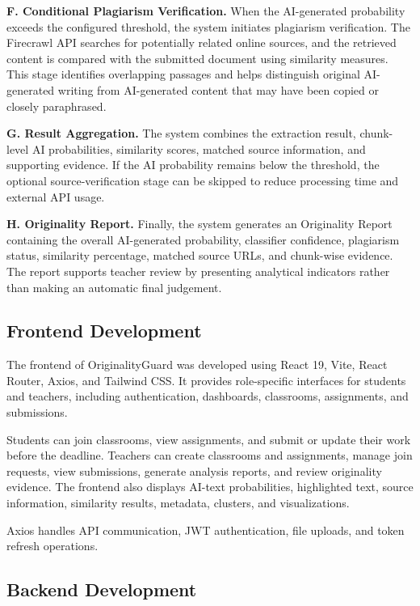 \documentclass[12pt, a4paper]{report}
\numberwithin{equation}{chapter}
\begin{document}
\noindent\textbf{F. Conditional Plagiarism Verification.} When the AI-generated probability exceeds the configured threshold, the system initiates plagiarism verification. The Firecrawl API searches for potentially related online sources, and the retrieved content is compared with the submitted document using similarity measures. This stage identifies overlapping passages and helps distinguish original AI-generated writing from AI-generated content that may have been copied or closely paraphrased.

\noindent\textbf{G. Result Aggregation.} The system combines the extraction result, chunk-level AI probabilities, similarity scores, matched source information, and supporting evidence. If the AI probability remains below the threshold, the optional source-verification stage can be skipped to reduce processing time and external API usage.

\noindent\textbf{H. Originality Report.} Finally, the system generates an Originality Report containing the overall AI-generated probability, classifier confidence, plagiarism status, similarity percentage, matched source URLs, and chunk-wise evidence. The report supports teacher review by presenting analytical indicators rather than making an automatic final judgement.



\subsection{Frontend Development}

The frontend of OriginalityGuard was developed using React 19, Vite, React
Router, Axios, and Tailwind CSS. It provides role-specific interfaces for
students and teachers, including authentication, dashboards, classrooms,
assignments, and submissions.

Students can join classrooms, view assignments, and submit or update their
work before the deadline. Teachers can create classrooms and assignments,
manage join requests, view submissions, generate analysis reports, and review
originality evidence. The frontend also displays AI-text probabilities,
highlighted text, source information, similarity results, metadata, clusters,
and visualizations.

Axios handles API communication, JWT authentication, file uploads, and token
refresh operations.

\subsection{Backend Development}
\end{document}
